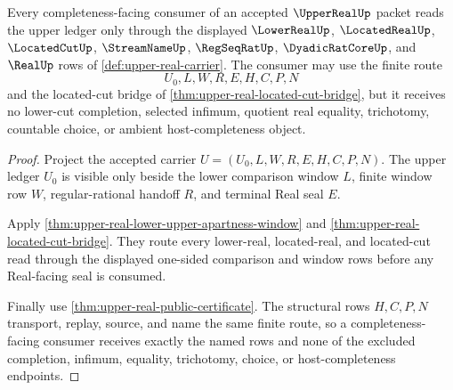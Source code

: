 \begin{theorem}
\label{thm:upper-real-completeness-facing-consumer-route}
Every completeness-facing consumer of an accepted $\UpperRealUp$ packet reads the upper ledger only through the displayed $\LowerRealUp$, $\LocatedRealUp$, $\LocatedCutUp$, $\StreamNameUp$, $\RegSeqRatUp$, $\DyadicRatCoreUp$, and $\RealUp$ rows of \autoref{def:upper-real-carrier}. The consumer may use the finite route
$$
U_0,L,W,R,E,H,C,P,N
$$
and the located-cut bridge of \autoref{thm:upper-real-located-cut-bridge}, but it receives no lower-cut completion, selected infimum, quotient real equality, trichotomy, countable choice, or ambient host-completeness object.
\end{theorem}
\begin{proof}
Project the accepted carrier $U=(U_0,L,W,R,E,H,C,P,N)$. The upper ledger $U_0$ is visible only beside the lower comparison window $L$, finite window row $W$, regular-rational handoff $R$, and terminal Real seal $E$.

Apply \autoref{thm:upper-real-lower-upper-apartness-window} and \autoref{thm:upper-real-located-cut-bridge}. They route every lower-real, located-real, and located-cut read through the displayed one-sided comparison and window rows before any Real-facing seal is consumed.

Finally use \autoref{thm:upper-real-public-certificate}. The structural rows $H,C,P,N$ transport, replay, source, and name the same finite route, so a completeness-facing consumer receives exactly the named rows and none of the excluded completion, infimum, equality, trichotomy, choice, or host-completeness endpoints.
\end{proof}

